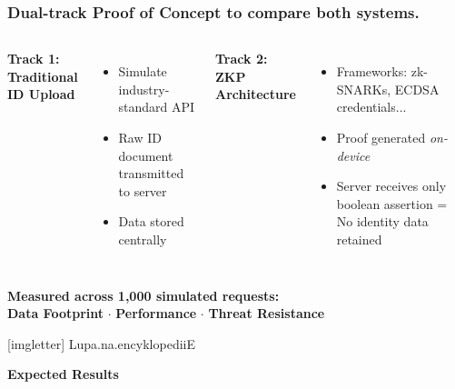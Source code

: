 \documentclass[aspectratio=169]{beamer}
\begin{document}
    \begin{frame}
        \frametitle{Dual-track Proof of Concept to compare both systems.}
        
        \begin{columns}[c]
            \textbf{\textcolor{hgpink}{Track 1: Traditional ID Upload}}
            \begin{itemize}
                \item Simulate industry-standard API
                \item Raw ID document transmitted to server
                \item Data stored centrally

            \end{itemize}
            
            \textbf{\textcolor{hgdarkgreen}{Track 2: ZKP Architecture}}
            \begin{itemize}
                \item Frameworks: zk-SNARKs, ECDSA credentials...
                \item Proof generated \textit{on-device}
                \item Server receives only boolean assertion = No identity data retained

            \end{itemize}
        \end{columns}
        

        
        \begin{center}
            \textbf{Measured across 1,000 simulated requests:}\\[4pt]
            \textcolor{hgorange}{\textbf{Data Footprint}}  $\cdot$ 
            \textcolor{hgpurple}{\textbf{Performance}}  $\cdot$ 
            \textcolor{hgblue}{\textbf{Threat Resistance}}
        \end{center}
    \end{frame}
    
    
  {
      [imgletter]
      {Lupa.na.encyklopedii}{E}
      
      \begin{frame}
          
          {\huge \textbf{\textcolor{hgwhite}{Expected Results}}}
          
      \end{frame}
  }
    
\end{document}
